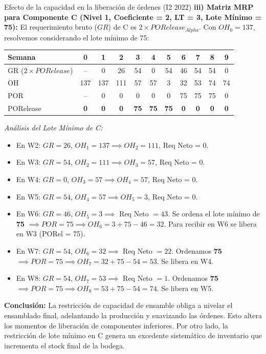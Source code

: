 \begin{ejercicio}{Efecto de la capacidad en la liberación de órdenes (I2 2022)}
\textbf{iii) Matriz MRP para Componente C (Nivel 1, Coeficiente = 2, LT = 3, Lote Mínimo = 75):}
El requerimiento bruto ($GR$) de C es $2 \times PORelease_{Alpha}$. Con $OH_0=137$, resolvemos considerando el lote mínimo de 75:
\begin{center}\small
\begin{tabular}{@{}lcccccccccc@{}}
  \toprule
  Semana & 0 & 1 & 2 & 3 & 4 & 5 & 6 & 7 & 8 & 9 \\
  \midrule
  GR ($2\times PORelease$) & -- & 0 & 26 & 54 & 0 & 54 & 46 & 54 & 54 & 0 \\
  OH                       & 137 & 137 & 111 & 57 & 57 & 3 & 32 & 53 & 74 & 74 \\
  POR                      & -- & 0 & 0 & 0 & 0 & 0 & 75 & 75 & 75 & 0 \\
  PORelease                & \textbf{0} & \textbf{0} & \textbf{0} & \textbf{75} & \textbf{75} & \textbf{75} & \textbf{0} & \textbf{0} & \textbf{0} & \textbf{0} \\
  \bottomrule
\end{tabular}
\end{center}
\textit{Análisis del Lote Mínimo de C:}
\begin{itemize}[leftmargin=1.4em, itemsep=1pt]
  \item En W2: $GR=26$, $OH_1=137 \implies OH_2=111$, Req Neto = 0.
  \item En W3: $GR=54$, $OH_2=111 \implies OH_3=57$, Req Neto = 0.
  \item En W4: $GR=0$, $OH_3=57 \implies OH_4=57$, Req Neto = 0.
  \item En W5: $GR=54$, $OH_4=57 \implies OH_5=3$, Req Neto = 0.
  \item En W6: $GR=46$, $OH_5=3 \implies$ Req Neto $= 43$. Se ordena el lote mínimo de \textbf{75} $\implies POR=75 \implies OH_6 = 3 + 75 - 46 = 32$. Para recibir en W6 se libera en W3 (PORel = 75).
  \item En W7: $GR=54$, $OH_6=32 \implies$ Req Neto $= 22$. Ordenamos \textbf{75} $\implies POR=75 \implies OH_7 = 32 + 75 - 54 = 53$. Se libera en W4.
  \item En W8: $GR=54$, $OH_7=53 \implies$ Req Neto $= 1$. Ordenamos \textbf{75} $\implies POR=75 \implies OH_8 = 53 + 75 - 54 = 74$. Se libera en W5.
\end{itemize}

\textbf{Conclusión:} La restricción de capacidad de ensamble obliga a nivelar el ensamblado final, adelantando la producción y suavizando las órdenes. Esto altera los momentos de liberación de componentes inferiores. Por otro lado, la restricción de lote mínimo en C genera un excedente sistemático de inventario que incrementa el stock final de la bodega.
\end{ejercicio}


